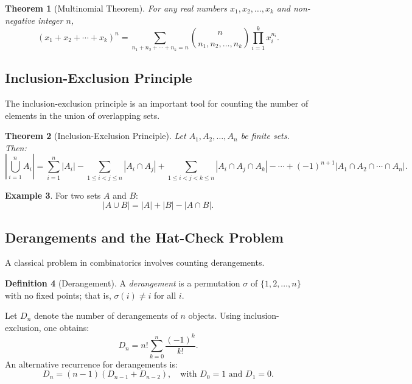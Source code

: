 \documentclass[12pt]{article}
\newtheorem{theorem}{Theorem}[section]
\theoremstyle{definition}
\newtheorem{definition}[theorem]{Definition}
\newtheorem{example}[theorem]{Example}
\begin{document}
\begin{theorem}[Multinomial Theorem]
  For any real numbers \(x_1, x_2, \dots, x_k\) and non-negative integer \(n\),
  \[
  (x_1+x_2+\cdots+x_k)^n = \sum_{n_1+n_2+\cdots+n_k=n} \binom{n}{n_1, n_2, \dots, n_k} \prod_{i=1}^k x_i^{n_i}.
  \]
\end{theorem}

\subsection{Inclusion-Exclusion Principle}

The inclusion-exclusion principle is an important tool for counting the number of elements in the union of overlapping sets.

\begin{theorem}[Inclusion-Exclusion Principle]
  Let \(A_1, A_2, \dots, A_n\) be finite sets. Then:
  \[
  \left| \bigcup_{i=1}^{n} A_i \right| = \sum_{i=1}^{n} |A_i| - \sum_{1\le i < j \le n} |A_i \cap A_j| + \sum_{1\le i < j < k \le n} |A_i \cap A_j \cap A_k| - \cdots + (-1)^{n+1} |A_1 \cap A_2 \cap \cdots \cap A_n|.
  \]
\end{theorem}

\begin{example}
  For two sets \(A\) and \(B\):
  \[
  |A \cup B| = |A| + |B| - |A \cap B|.
  \]
\end{example}

\subsection{Derangements and the Hat-Check Problem}

A classical problem in combinatorics involves counting derangements.

\begin{definition}[Derangement]
  A \emph{derangement} is a permutation \(\sigma\) of \(\{1,2,\dots,n\}\) with no fixed points; that is, \(\sigma(i) \neq i\) for all \(i\).
\end{definition}

Let \(D_n\) denote the number of derangements of \(n\) objects. Using inclusion-exclusion, one obtains:
\[
D_n = n! \sum_{k=0}^{n} \frac{(-1)^k}{k!}.
\]
An alternative recurrence for derangements is:
\[
D_n = (n-1)(D_{n-1} + D_{n-2}), \quad \text{with } D_0 = 1 \text{ and } D_1 = 0.
\]
\end{document}
